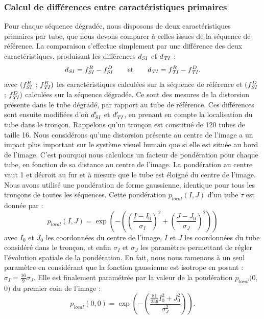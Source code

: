 \subsubsection{Calcul de différences entre caractéristiques primaires}
Pour chaque séquence dégradée, nous disposons de deux caractéristiques primaires par tube, que nous devons comparer à celles issues de la séquence de référence. La comparaison s'effectue simplement par une différence des deux caractéristiques, produisant les différences $d_{\mathit{SI}}$ et $d_{\mathit{TI}}$ :
\begin{equation}
d_{\mathit{SI}} = f_{\mathit{SI}}^R - f_{\mathit{SI}}^D \qquad \text{et} \qquad d_{\mathit{TI}} = f_{\mathit{TI}}^R - f_{\mathit{TI}}^D.
\end{equation}
%
avec $(f_{\mathit{SI}}^R$ ; $f_{\mathit{TI}}^R)$ les caractéristiques calculées sur la séquence de référence et $(f_{\mathit{SI}}^D$ ; $f_{\mathit{TI}}^D)$ calculées sur la séquence dégradée. Ce sont des mesures de la distorsion présente dans le tube dégradé, par rapport au tube de référence. Ces différences sont ensuite modifiées d'où $d'_{\mathit{SI}}$ et $d'_{\mathit{TI}}$, en prenant en compte la localisation du tube dans le tronçon. Rappelons qu'un tronçon est constitué de 120 tubes de taille 16. Nous considérons qu'une distorsion présente au centre de l'image a un impact plus important sur le système visuel humain que si elle est située au bord de l'image. C'est pourquoi nous calculons un facteur de pondération pour chaque tube, en fonction de sa distance au centre de l'image. La pondération au centre vaut 1 et décroit au fur et à mesure que le tube est éloigné du centre de l'image. Nous avons utilisé une pondération de forme gaussienne, identique pour tous les tronçons de toutes les séquences. Cette pondération $p_{\textit{local}}(I,J)$ d'un tube $\tau$ est donnée par :
\begin{equation}
p_{\textit{local}}(I,J) = \exp\left(- \left( \left(\frac{I - I_0}{\sigma_I}\right)^2 + \left(\frac{J - J_0}{\sigma_J}\right)^2 \right) \right)
\end{equation}
%
avec $I_0$ et $J_0$ les coordonnées du centre de l'image, $I$ et $J$ les coordonnées du tube considéré dans le tronçon, et enfin $\sigma_I$ et $\sigma_J$ les paramètres permettant de régler l'évolution spatiale de la pondération. En fait, nous nous ramenons à un seul paramètre en considérant que la fonction gaussienne est isotrope en posant : $\sigma_I = \frac{16}{9}\sigma_J$. Elle est finalement paramétrée par la valeur de la pondération $p_{\textit{local}}($0$,$0$)$ du premier coin de l'image :
\begin{equation}
p_{\textit{local}}(\text{0},\text{0}) = \exp\left(- \left( \frac{\frac{81}{256}I_0^2 + J_0^2}{\sigma_J^2}\right)\right).
\end{equation}
